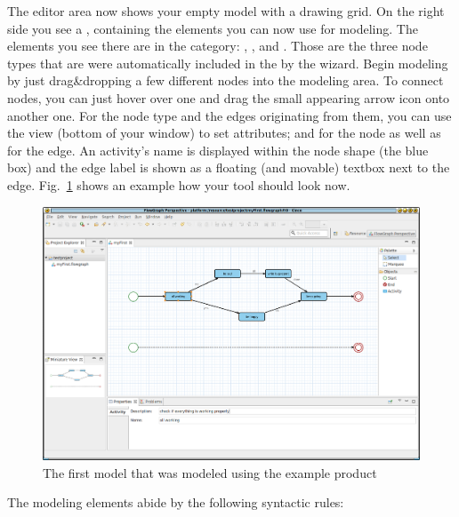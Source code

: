 \documentclass[a4paper,american,12pt]{scrreprt}
\begin{document}
The editor area now shows your empty model with a drawing grid. On the right
side you see a , containing the elements you can now use for modeling.
The elements you see there are in the 
category: , , and . Those are the three node
types that are were automatically included in the  by the
wizard. Begin modeling by just drag\&dropping a few different nodes into the
modeling area. To connect nodes, you can just hover over one and drag the small
appearing arrow icon onto another one. For the  node type and
the edges originating from them, you can use the  view (bottom
of your window) to set attributes;  and  for the
node as well as  for the edge. An activity's name is displayed
within the node shape (the blue box) and the edge label is shown as a floating
(and movable) textbox next to the edge. Fig.~\ref{fig:firstModel} shows an
example how your tool should look now.

\begin{figure}
	\centering
	\includegraphics[width=.9\textwidth]{screenshots/cp-first-model.png} 
	\caption{The first model that was modeled using the example \cinco product}
	\label{fig:firstModel}
\end{figure}

The modeling elements abide by the following syntactic rules:
\end{document}
